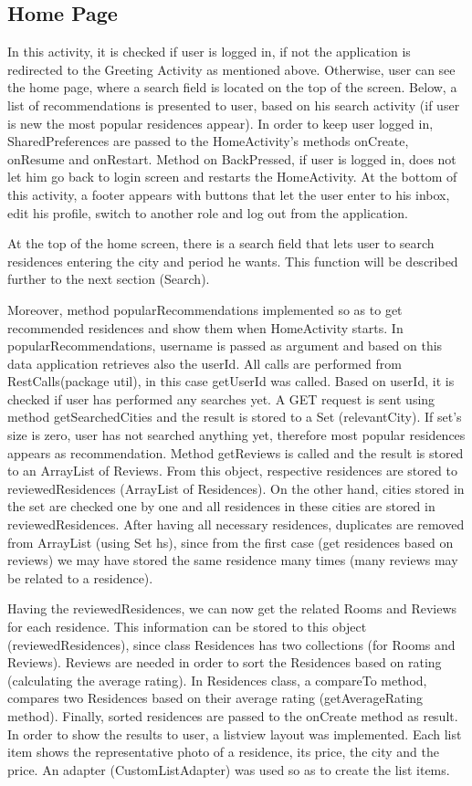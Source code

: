 \documentclass[12pt]{article}
\begin{document}
	\subsection{Home Page}
	In this activity, it is checked if user is logged in, if not the application is redirected to the Greeting Activity as mentioned above. Otherwise, user can see the home page, where a search field is located on the top of the screen. Below, a list of recommendations is presented to user, based on his search activity (if user is new the most popular residences appear).
	In order to keep user logged in, SharedPreferences are passed to the HomeActivity's methods onCreate, onResume and onRestart. Method on BackPressed, if user is logged in, does not let him go back to login screen and restarts the HomeActivity. At the bottom of this activity, a footer appears with buttons that let the user enter to his inbox, edit his profile, switch to another role and log out from the application.
	
	At the top of the home screen, there is a search field that lets user to search residences entering the city and period he wants. This function will be described further to the next section (Search).
	
	Moreover, method popularRecommendations implemented so as to get recommended residences and show them when HomeActivity starts. In popularRecommendations, username is passed as argument and based on this data application retrieves also the userId. All calls are performed from RestCalls(package util), in this case getUserId was called. Based on userId, it is checked if user has performed any searches yet. A GET request is sent using method getSearchedCities and the result is stored to a Set (relevantCity). If set's size is zero, user has not searched anything yet, therefore most popular residences appears as recommendation. Method getReviews is called and the result is stored to an ArrayList of Reviews. From this object, respective residences are stored to reviewedResidences (ArrayList of Residences). On the other hand, cities stored in the set are checked one by one and all residences in these cities are stored in reviewedResidences. After having all necessary residences, duplicates are removed from ArrayList (using Set hs), since from the first case (get residences based on reviews) we may have stored the same residence many times (many reviews may be related to a residence).
	
	Having the reviewedResidences, we can now get the related Rooms and Reviews for each residence. This information can be stored to this object (reviewedResidences), since class Residences has two collections (for Rooms and Reviews). Reviews are needed in order to sort the Residences based on rating (calculating the average rating). In Residences class, a compareTo method, compares two Residences based on their average rating (getAverageRating method). Finally, sorted residences are passed to the onCreate method as result. In order to show the results to user, a listview layout was implemented. Each list item shows the representative photo of a residence, its price, the city and the price. An adapter (CustomListAdapter) was used so as to create the list items.
	
\end{document}
